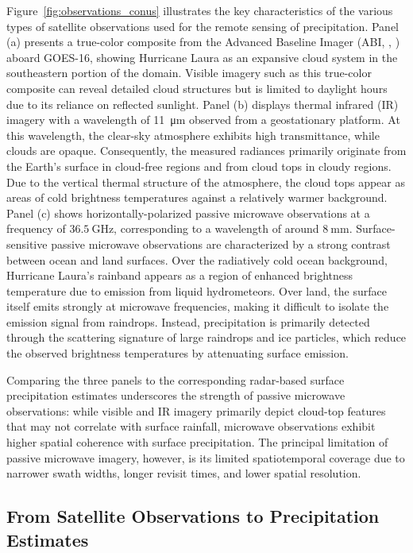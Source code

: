 \documentclass[11pt]{article}
\begin{document}
Figure~\ref{fig:observations_conus} illustrates the key characteristics of the
various types of satellite observations used for the remote sensing of
precipitation. Panel (a) presents a true-color composite from the Advanced
Baseline Imager (ABI, \citeauthor{Schmit2005Introducing},
\citeyear{Schmit2005Introductin}) aboard GOES-16, showing Hurricane Laura as an
expansive cloud system in the southeastern portion of the domain. Visible
imagery such as this true-color composite can reveal detailed cloud structures
but is limited to daylight hours due to its reliance on reflected sunlight.
Panel (b) displays thermal infrared (IR) imagery with a wavelength of
\SI{11}{\micro \meter} observed from a geostationary platform. At this
wavelength, the clear-sky atmosphere exhibits high transmittance, while clouds
are opaque. Consequently, the measured radiances primarily originate from the
Earth’s surface in cloud-free regions and from cloud tops in cloudy regions. Due
to the vertical thermal structure of the atmosphere, the cloud tops appear as
areas of cold brightness temperatures against a relatively warmer background.
Panel (c) shows horizontally-polarized passive microwave observations at a
frequency of $\SI{36.5}{\giga \hertz}$, corresponding to a wavelength of around
$\SI{8}{\milli \meter}$. Surface-sensitive passive microwave observations are
characterized by a strong contrast between ocean and land surfaces. Over the
radiatively cold ocean background, Hurricane Laura's rainband appears as a
region of enhanced brightness temperature due to emission from liquid
hydrometeors. Over land, the surface itself emits strongly at microwave
frequencies, making it difficult to isolate the emission signal from raindrops.
Instead, precipitation is primarily detected through the scattering signature of
large raindrops and ice particles, which reduce the observed brightness
temperatures by attenuating surface emission.

Comparing the three panels to the corresponding radar-based surface
precipitation estimates underscores the strength of passive microwave
observations: while visible and IR imagery primarily depict cloud-top features
that may not correlate with surface rainfall, microwave observations exhibit
higher spatial coherence with surface precipitation. The principal limitation of
passive microwave imagery, however, is its limited spatiotemporal coverage due
to narrower swath widths, longer revisit times, and lower spatial resolution.

\subsection{From Satellite Observations to Precipitation Estimates}
\end{document}
